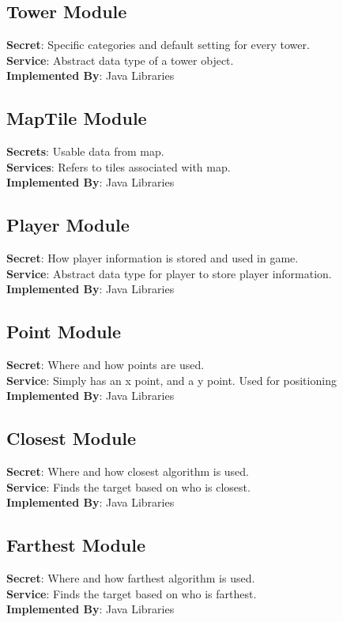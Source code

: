 \documentclass[12,english]{article}
\begin{document}
    \subsection{Tower Module}
	\textbf{Secret}: Specific categories and default setting for every tower. \\
	\textbf{Service}: Abstract data type of a tower object.\\
	\textbf{Implemented By}: Java Libraries 
	
	\subsection{MapTile Module}
	\textbf{Secrets}: Usable data from map. \\
	\textbf{Services}: Refers to tiles associated with map.  \\
	\textbf{Implemented By}:  Java Libraries\\
	
	\subsection{Player Module}
	\textbf{Secret}: How player information is stored and used in game.  \\
	\textbf{Service}: Abstract data type for player to store player information. \\
	\textbf{Implemented By}: Java Libraries \\
	
	\subsection{Point Module}
	\textbf{Secret}: Where and how points are used. \\
	\textbf{Service}: Simply has an x point, and a y point. Used for positioning  \\ 
	\textbf{Implemented By}: Java Libraries\\
	
	\subsection{Closest Module}
	\textbf{Secret}: Where and how closest algorithm is used. \\
	\textbf{Service}: Finds the target based on who is closest.  \\ 
	\textbf{Implemented By}: Java Libraries\\
	
	\subsection{Farthest Module}
	\textbf{Secret}: Where and how farthest algorithm is used. \\
	\textbf{Service}: Finds the target based on who is farthest. \\ 
	\textbf{Implemented By}: Java Libraries\\
	
\end{document}
